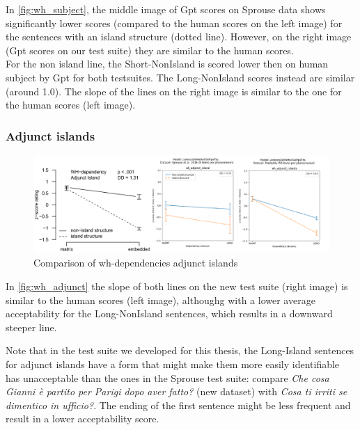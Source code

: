 In \autoref{fig:wh_subject}, the middle image of Gpt scores on Sprouse data shows significantly lower scores (compared to the human scores on the left image) for the sentences with an island structure (dotted line). %
However, on the right image (Gpt scores on our test suite) they are similar to the human scores. \\

For the non island line, the Short-NonIsland is scored lower then on human subject by Gpt for both testsuites. The Long-NonIsland scores instead are similar  (around 1.0). %
The slope of the lines on the right image is similar to the one for the human scores (left image). %


\subsubsection{Adjunct islands}

\begin{figure}[H]
	\centering
	\includegraphics[width=1\textwidth]{images/Chapter1/combined_wh-adjunct.png} 
	\caption{Comparison of wh-dependencies adjunct islands} 
	\label{fig:wh_adjunct} %
\end{figure}


In \autoref{fig:wh_adjunct} the slope of both lines on the new test suite (right image) is similar to the human scores (left image), althoughg with a lower average acceptability for the Long-NonIsland sentences, which results in a downward steeper line. 

Note that in the test suite we developed for this thesis, the Long-Island sentences for adjunct islands have a form that might make them more easily identifiable has unacceptable than the ones in the Sprouse test suite: compare \textit{Che cosa Gianni è partito per Parigi dopo aver fatto?} (new dataset) with \textit{Cosa ti irriti se dimentico in ufficio?}. The ending of the first sentence might be less frequent and result in a lower acceptability score.



